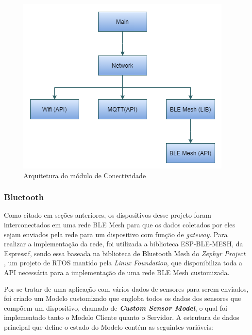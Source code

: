 \documentclass[../monografia.tex]{subfiles}
\begin{document}
\begin{figure}[h!]
	\centering
	\includegraphics[scale=0.8]{netw-arch}
	\caption{Arquitetura do módulo de Conectividade} %
	\label{fig:netw-arch}
\end{figure}

\subsubsection{Bluetooth} \label{dev-bluetooth-section}

Como citado em seções anteriores, os dispositivos desse projeto foram interconectados em uma rede BLE Mesh para que os dados coletados por eles sejam enviados pela rede para um dispositivo com função de \textit{gateway}. Para realizar a implementação da rede, foi utilizada a biblioteca ESP-BLE-MESH, da Espressif, sendo essa baseada na biblioteca de Bluetooth Mesh do \textit{Zephyr Project} \cite{zephyrproject}, um projeto de RTOS mantido pela \textit{Linux Foundation}, que disponibiliza toda a API necessária para a implementação de uma rede BLE Mesh customizada.

Por se tratar de uma aplicação com vários dados de sensores para serem enviados, foi criado um Modelo customizado que engloba todos os dados dos sensores que compõem um dispositivo, chamado de \textit{\textbf{Custom Sensor Model}}, o qual foi implementado tanto o Modelo Cliente quanto o Servidor. A estrutura de dados principal que define o estado do Modelo contém as seguintes variáveis: 
\end{document}
